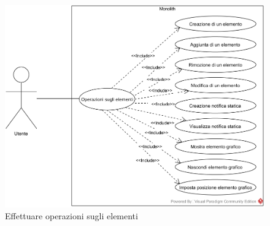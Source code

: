 \begin{figure}[H]
	\centering
	\includegraphics[width=15cm]{../../documenti/AnalisiDeiRequisiti/Diagrammi_img/operazioni.png}
	\caption{\UCCaption{} Effettuare operazioni sugli elementi}
\end{figure}

